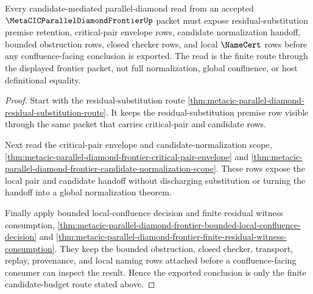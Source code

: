 \begin{theorem}
\label{thm:metacic-parallel-diamond-frontier-seed-route}
Every candidate-mediated parallel-diamond read from an accepted $\MetaCICParallelDiamondFrontierUp$ packet must expose residual-substitution premise retention, critical-pair envelope rows, candidate normalization handoff, bounded obstruction rows, closed checker rows, and local $\NameCert$ rows before any confluence-facing conclusion is exported. The read is the finite route through the displayed frontier packet, not full normalization, global confluence, or host definitional equality.
\end{theorem}
\begin{proof}
Start with the residual-substitution route \autoref{thm:metacic-parallel-diamond-residual-substitution-route}. It keeps the residual-substitution premise row visible through the same packet that carries critical-pair and candidate rows.

Next read the critical-pair envelope and candidate-normalization scope, \autoref{thm:metacic-parallel-diamond-frontier-critical-pair-envelope} and \autoref{thm:metacic-parallel-diamond-frontier-candidate-normalization-scope}. These rows expose the local pair and candidate handoff without discharging substitution or turning the handoff into a global normalization theorem.

Finally apply bounded local-confluence decision and finite residual witness consumption, \autoref{thm:metacic-parallel-diamond-frontier-bounded-local-confluence-decision} and \autoref{thm:metacic-parallel-diamond-frontier-finite-residual-witness-consumption}. They keep the bounded obstruction, closed checker, transport, replay, provenance, and local naming rows attached before a confluence-facing consumer can inspect the result. Hence the exported conclusion is only the finite candidate-budget route stated above.
\end{proof}

